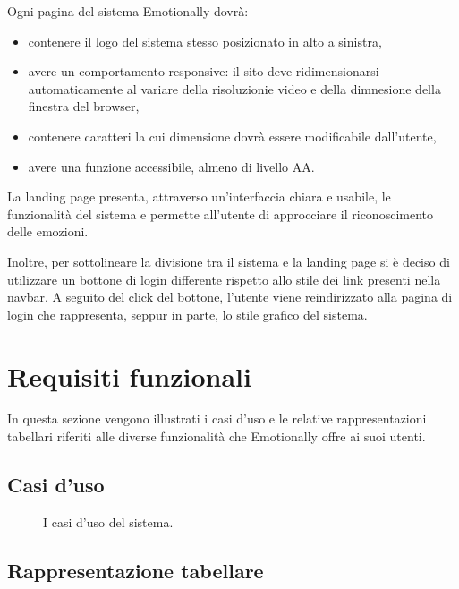 Ogni pagina del sistema Emotionally dovrà:
\begin{itemize}
	\item contenere il logo del sistema stesso posizionato in alto a sinistra,
	\item avere un comportamento responsive: il sito deve ridimensionarsi 
	automaticamente al variare della risoluzionie video e della dimnesione 
	della finestra del browser,
	\item contenere caratteri la cui dimensione dovrà essere modificabile 
	dall'utente,
	\item avere una funzione accessibile, almeno di livello AA.
\end{itemize}
La landing page presenta, attraverso un'interfaccia chiara e usabile, le 
funzionalità del sistema e permette all'utente di approcciare il riconoscimento 
delle emozioni. 

Inoltre, per sottolineare la divisione tra il sistema e la landing page si è 
deciso di utilizzare un bottone di login differente rispetto allo stile dei 
link presenti nella navbar. A seguito del click del bottone, l'utente viene 
reindirizzato alla pagina di login che rappresenta, seppur in parte, lo stile 
grafico del sistema.

\section{Requisiti funzionali}\label{sec:requisiti-funzionali}

In questa sezione vengono illustrati i casi d'uso e le relative 
rappresentazioni tabellari riferiti alle diverse funzionalità che Emotionally 
offre ai suoi utenti. 

\subsection{Casi d'uso}

\begin{figure}[H]
	\centering
    \caption{I casi d'uso del sistema.}
    \label{fig:casi-duso}
    \resizebox{\textwidth}{!}{%
        
    }
\end{figure}

\subsection{Rappresentazione tabellare}


